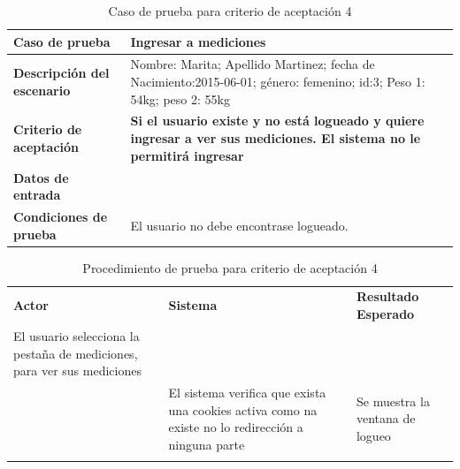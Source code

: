 		{\scriptsize
    \begin{table} [h]
    \centering
	\begin{tabular}{||l|p{10cm}||}
    	\rowcolor[gray]{0.9}
	    \hline 
        \hline 
		\textbf{Caso de prueba} & \textbf{Ingresar a mediciones} \\  \hline
	    \textbf{Descripción del escenario}& Nombre: Marita; Apellido Martinez; fecha de Nacimiento:2015-06-01; género: femenino; id:3; Peso 1: 54kg; peso 2: 55kg\\ \hline
	    \textbf{Criterio de aceptación}&\textbf{Si el usuario existe y no está logueado y quiere ingresar a ver sus mediciones. El sistema no le permitirá ingresar}\\ \hline
        \textbf{Datos de entrada}&  \\ \hline
        \textbf{Condiciones de  prueba}& El usuario no debe encontrase logueado.\\ \hline \hline
	    \end{tabular}
        \caption{Caso de prueba para criterio de aceptación 4}
    	\end{table}
		}
	

	\begin{longtable}{|p{5cm}|p{5cm}|p{5cm}|}
	    \hline \rowcolor[gray]{0.9}
        \multicolumn{3}{|l|}{\textbf{Procedimiento de Prueba -Ingresar mediciones}} \\ \hline
	    \textbf{Actor} & \textbf{Sistema}&\textbf{Resultado Esperado} \\  \hline
	   El usuario selecciona la pestaña de mediciones, para ver sus mediciones & & \\ \hline
        & El sistema  verifica que exista una cookies activa como na existe no lo redirección a ninguna parte &  Se muestra la ventana de logueo \\ \hline
   \caption{Procedimiento de prueba para criterio de aceptación 4}        
    \end{longtable}
 


